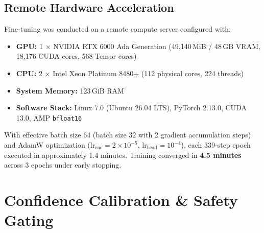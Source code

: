 \documentclass[10pt,conference]{IEEEtran}
\begin{document}
\subsection{Remote Hardware Acceleration}
Fine-tuning was conducted on a remote compute server configured with:
\begin{itemize}
    \item \textbf{GPU:} 1 $\times$ NVIDIA RTX 6000 Ada Generation (49,140\,MiB / 48\,GB VRAM, 18,176 CUDA cores, 568 Tensor cores)
    \item \textbf{CPU:} 2 $\times$ Intel Xeon Platinum 8480+ (112 physical cores, 224 threads)
    \item \textbf{System Memory:} 123\,GiB RAM
    \item \textbf{Software Stack:} Linux 7.0 (Ubuntu 26.04 LTS), PyTorch 2.13.0, CUDA 13.0, AMP \texttt{bfloat16}
\end{itemize}

With effective batch size 64 (batch size 32 with 2 gradient accumulation steps) and AdamW optimization ($\text{lr}_{\text{enc}} = 2 \times 10^{-5}$, $\text{lr}_{\text{head}} = 10^{-4}$), each 339-step epoch executed in approximately 1.4 minutes. Training converged in \textbf{4.5 minutes} across 3 epochs under early stopping.

\begin{table}[t]
\centering
\caption{Multi-Task Loss Convergence Across Training Epochs}
\label{tab:convergence}
\end{table}

\section{Confidence Calibration \& Safety Gating}
\end{document}
